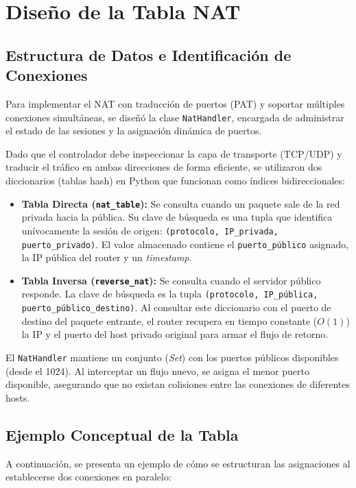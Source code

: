 \documentclass[11pt, a4paper]{article}
\begin{document}
\section{Diseño de la Tabla NAT}
\label{sec:diseno_tabla_nat}

\subsection{Estructura de Datos e Identificación de Conexiones}
Para implementar el NAT con traducción de puertos (PAT) y soportar múltiples conexiones simultáneas, se diseñó la clase \texttt{NatHandler}, encargada de administrar el estado de las sesiones y la asignación dinámica de puertos. 

Dado que el controlador debe inspeccionar la capa de transporte (TCP/UDP) y traducir el tráfico en ambas direcciones de forma eficiente, se utilizaron dos diccionarios (tablas hash) en Python que funcionan como índices bidireccionales:

\begin{itemize}
    \item \textbf{Tabla Directa (\texttt{nat\_table}):} Se consulta cuando un paquete sale de la red privada hacia la pública. Su clave de búsqueda es una tupla que identifica unívocamente la sesión de origen: \texttt{(protocolo, IP\_privada, puerto\_privado)}. El valor almacenado contiene el \texttt{puerto\_público} asignado, la IP pública del router y un \textit{timestamp}.
    \item \textbf{Tabla Inversa (\texttt{reverse\_nat}):} Se consulta cuando el servidor público responde. La clave de búsqueda es la tupla \texttt{(protocolo, IP\_pública, puerto\_público\_destino)}. Al consultar este diccionario con el puerto de destino del paquete entrante, el router recupera en tiempo constante ($O(1)$) la IP y el puerto del host privado original para armar el flujo de retorno.
\end{itemize}

El \texttt{NatHandler} mantiene un conjunto (\textit{Set}) con los puertos públicos disponibles (desde el 1024). Al interceptar un flujo nuevo, se asigna el menor puerto disponible, asegurando que no existan colisiones entre las conexiones de diferentes hosts.

\subsection{Ejemplo Conceptual de la Tabla}
A continuación, se presenta un ejemplo de cómo se estructuran las asignaciones al establecerse dos conexiones en paralelo:
\end{document}
